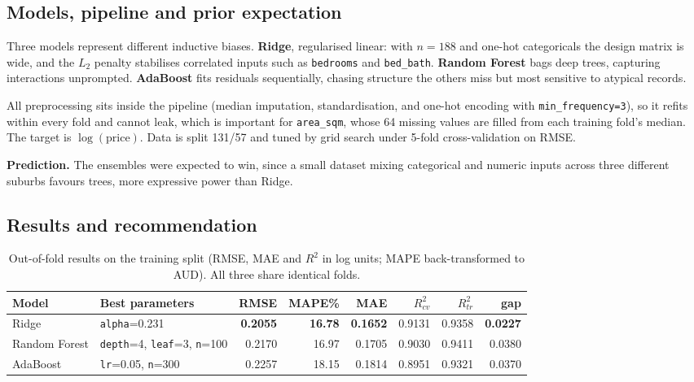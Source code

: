 \subsection{Models, pipeline and prior expectation}

Three models represent different inductive biases. \textbf{Ridge}, regularised linear:
with $n=188$ and one-hot categoricals the design matrix is wide, and the $L_2$ penalty
stabilises correlated inputs such as \texttt{bedrooms} and \texttt{bed\_bath}.
\textbf{Random Forest} bags deep trees, capturing interactions unprompted.
\textbf{AdaBoost} fits residuals sequentially, chasing structure the others miss but
most sensitive to atypical records.

All preprocessing sits inside the pipeline (median imputation, standardisation, and
one-hot encoding with \texttt{min\_frequency=3}), so it refits within every fold and
cannot leak, which is important for \texttt{area\_sqm}, whose 64 missing values are filled
from each training fold's median. The target is $\log(\text{price})$. Data is split 131/57 and tuned by grid
search under 5-fold cross-validation on RMSE.

\textbf{Prediction.} The ensembles were expected to win, since a small dataset mixing
categorical and numeric inputs across three different suburbs favours trees, more expressive power than Ridge.

\subsection{Results and recommendation}

\begin{table}[H]
\centering\small
\begin{tabularx}{\textwidth}{@{}l X r r r r r r@{}}
\toprule
\textbf{Model} & \textbf{Best parameters} & \textbf{RMSE} & \textbf{MAPE\%} & \textbf{MAE} & \textbf{$R^2_{cv}$} & \textbf{$R^2_{tr}$} & \textbf{gap} \\
\midrule
Ridge         & \texttt{alpha}=0.231                                & \textbf{0.2055} & \textbf{16.78} & \textbf{0.1652} & 0.9131 & 0.9358 & \textbf{0.0227} \\
Random Forest & \texttt{depth}=4, \texttt{leaf}=3, \texttt{n}=100    & 0.2170 & 16.97 & 0.1705 & 0.9030 & 0.9411 & 0.0380 \\
AdaBoost      & \texttt{lr}=0.05, \texttt{n}=300                     & 0.2257 & 18.15 & 0.1814 & 0.8951 & 0.9321 & 0.0370 \\
\bottomrule
\end{tabularx}
\caption{Out-of-fold results on the training split (RMSE, MAE and $R^2$ in log
units; MAPE back-transformed to AUD). All three share identical folds.}
\label{tab:models}
\end{table}

